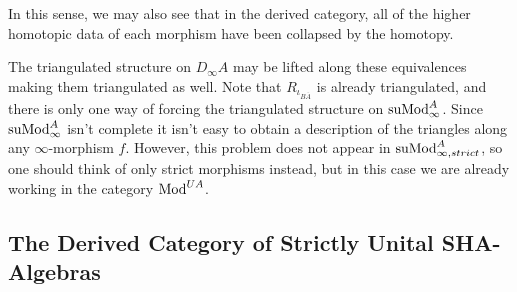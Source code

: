 \documentclass[../thesis.tex]{subfiles}
\begin{document}
            In this sense, we may also see that in the derived category, all of the higher homotopic data of each morphism have been collapsed by the homotopy.

            The triangulated structure on $D_\infty A$ may be lifted along these equivalences making them triangulated as well. Note that $R_{\iota_{B\overline{A}}}$ is already triangulated, and there is only one way of forcing the triangulated structure on $\tt{suMod}_\infty^A$. Since $\tt{suMod}_{\infty}^A$ isn't complete it isn't easy to obtain a description of the triangles along any $\infty$-morphism $f$. However, this problem does not appear in $\tt{suMod}_{\infty, strict}^A$, so one should think of only strict morphisms instead, but in this case we are already working in the category $\tt{Mod}^{UA}$. 
        \subsection{The Derived Category of Strictly Unital SHA-Algebras}
\end{document}
